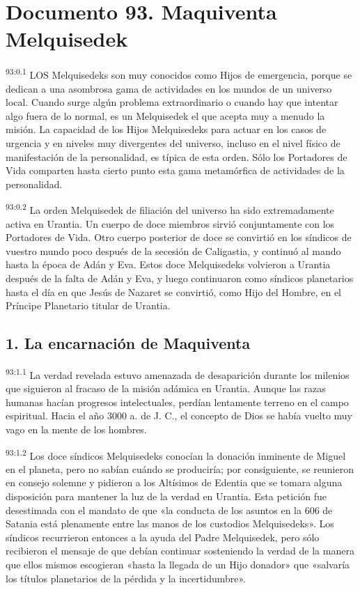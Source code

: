 \chapter{Documento 93. Maquiventa Melquisedek}
\par
\textsuperscript{93:0.1} LOS Melquisedeks son muy conocidos como Hijos de emergencia, porque se dedican a una asombrosa gama de actividades en los mundos de un universo local. Cuando surge algún problema extraordinario o cuando hay que intentar algo fuera de lo normal, es un Melquisedek el que acepta muy a menudo la misión. La capacidad de los Hijos Melquisedeks para actuar en los casos de urgencia y en niveles muy divergentes del universo, incluso en el nivel físico de manifestación de la personalidad, es típica de esta orden. Sólo los Portadores de Vida comparten hasta cierto punto esta gama metamórfica de actividades de la personalidad.

\par
\textsuperscript{93:0.2} La orden Melquisedek de filiación del universo ha sido extremadamente activa en Urantia. Un cuerpo de doce miembros sirvió conjuntamente con los Portadores de Vida. Otro cuerpo posterior de doce se convirtió en los síndicos de vuestro mundo poco después de la secesión de Caligastia, y continuó al mando hasta la época de Adán y Eva. Estos doce Melquisedeks volvieron a Urantia después de la falta de Adán y Eva, y luego continuaron como síndicos planetarios hasta el día en que Jesús de Nazaret se convirtió, como Hijo del Hombre, en el Príncipe Planetario titular de Urantia.

\section*{1. La encarnación de Maquiventa}
\par
\textsuperscript{93:1.1} La verdad revelada estuvo amenazada de desaparición durante los milenios que siguieron al fracaso de la misión adámica en Urantia. Aunque las razas humanas hacían progresos intelectuales, perdían lentamente terreno en el campo espiritual. Hacia el año 3000 a. de J. C., el concepto de Dios se había vuelto muy vago en la mente de los hombres.

\par
\textsuperscript{93:1.2} Los doce síndicos Melquisedeks conocían la donación inminente de Miguel en el planeta, pero no sabían cuándo se produciría; por consiguiente, se reunieron en consejo solemne y pidieron a los Altísimos de Edentia que se tomara alguna disposición para mantener la luz de la verdad en Urantia. Esta petición fue desestimada con el mandato de que «la conducta de los asuntos en la 606 de Satania está plenamente entre las manos de los custodios Melquisedeks». Los síndicos recurrieron entonces a la ayuda del Padre Melquisedek, pero sólo recibieron el mensaje de que debían continuar sosteniendo la verdad de la manera que ellos mismos escogieran «hasta la llegada de un Hijo donador» que «salvaría los títulos planetarios de la pérdida y la incertidumbre».

